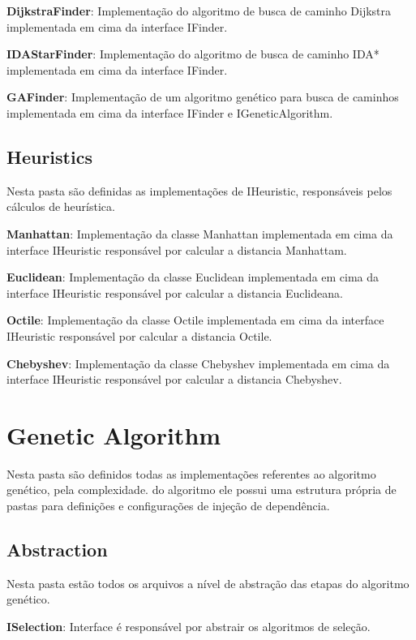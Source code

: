  \textbf{DijkstraFinder}: Implementação do algoritmo de busca de caminho Dijkstra implementada em cima da interface IFinder.
 
 \textbf{IDAStarFinder}: Implementação do algoritmo de busca de caminho IDA* implementada em cima da interface IFinder.
 
 \textbf{GAFinder}: Implementação de um algoritmo genético para busca de caminhos implementada em cima da interface IFinder e IGeneticAlgorithm.
 
 \subsection{Heuristics}
 
 Nesta pasta são definidas as implementações de IHeuristic, responsáveis pelos cálculos de heurística.
 
 \textbf{Manhattan}: Implementação da classe Manhattan implementada em cima da interface IHeuristic responsável por calcular a distancia Manhattam.
 
 \textbf{Euclidean}: Implementação da classe Euclidean implementada em cima da interface IHeuristic responsável por calcular a distancia Euclideana.
 
 \textbf{Octile}: Implementação da classe Octile implementada em cima da interface IHeuristic responsável por calcular a distancia Octile.
 
 \textbf{Chebyshev}: Implementação da classe Chebyshev implementada em cima da interface IHeuristic responsável por calcular a distancia Chebyshev.
 
 \section{Genetic Algorithm}
 
 Nesta pasta são definidos todas as implementações referentes ao algoritmo genético, pela complexidade.
 do algoritmo ele possui uma estrutura própria de pastas para definições e configurações de injeção de dependência.
 
 \subsection{Abstraction}
 
 Nesta pasta estão todos os arquivos a nível de abstração das etapas do algoritmo genético.
 
 \textbf{ISelection}: Interface é responsável por abstrair os algoritmos de seleção.
 
